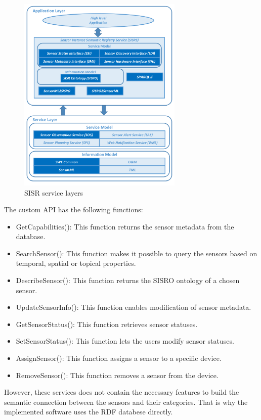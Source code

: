 \begin{figure}[h]
	\centering
	\includegraphics[width=0.7\textwidth]{figures/sisrserv.png}
	\caption{SISR service layers\label{fig:sisrserv}}
\end{figure}
The custom API has the following functions:
\begin{itemize}
\item GetCapabilities(): This function returns the sensor metadata from the database.
\item SearchSensor(): This function makes it possible to query the sensors based on temporal, spatial or topical properties.
\item DescribeSensor(): This function returns the SISRO ontology of a chosen sensor.
\item UpdateSensorInfo(): This function enables modification of sensor metadata.
\item GetSensorStatus(): This function retrieves sensor statuses.
\item SetSensorStatus(): This function lets the users modify sensor statuses.
\item AssignSensor(): This function assigns a sensor to a specific device.
\item RemoveSensor(): This function removes a sensor from the device.
\end{itemize}

However, these services does not contain the necessary features to build the semantic connection between the sensors and their categories. That is why the implemented software uses the RDF databese directly.

